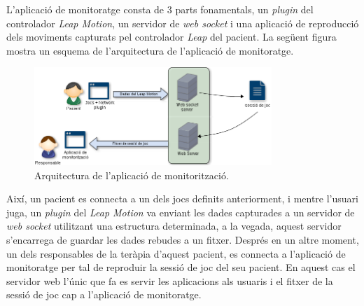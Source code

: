 \documentclass[12pt,a4paper,catalan]{article}
\begin{document}
	L'aplicació de monitoratge consta de 3 parts fonamentals, un \textit{plugin} del controlador \textit{Leap Motion}, un servidor de \textit{web socket} i una aplicació de reproducció dels moviments capturats pel controlador \textit{Leap} del pacient. La següent figura mostra un esquema de l'arquitectura de l'aplicació de monitoratge.
	\begin{figure}[H]
		\includegraphics[width=0.8\textwidth,keepaspectratio]{esquema-monitoritzacio.png}
		\centering
		\caption{Arquitectura de l'aplicació de monitorització.}
		\label{fig:arquitectura-monitoratge}
	\end{figure}
	Així, un pacient es connecta a un dels jocs definits anteriorment, i mentre l'usuari juga, un \textit{plugin} del \textit{Leap Motion} va enviant les dades capturades a un servidor de \textit{web socket} utilitzant una estructura determinada, a la vegada, aquest servidor s'encarrega de guardar les dades rebudes a un fitxer. Després en un altre moment, un dels responsables de la teràpia d'aquest pacient, es connecta a l'aplicació de monitoratge per tal de reproduir la sessió de joc del seu pacient. En aquest cas el servidor web l'únic que fa es servir les aplicacions als usuaris i el fitxer de la sessió de joc cap a l'aplicació de monitoratge.
\end{document}
